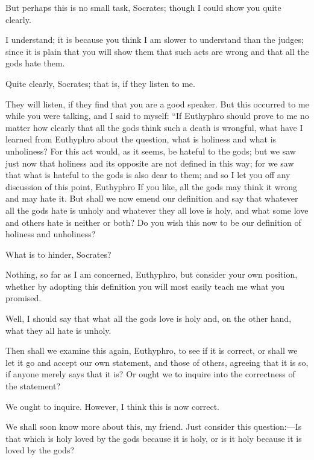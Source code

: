 \documentclass[letterpaper,12pt]{article}
\newcommand{\stephpag}[1]{\marginnote{\small\itshape\fontfamily{ppl}\selectfont #1}}
\begin{document}
\begin{drama}
\euthyphrospeaks
But perhaps this is no small task, Socrates; though I could show you quite clearly.

\socratesspeaks
I understand; it is because you think I am slower to understand than the judges; since it is plain that you will show them that such acts are wrong and that all the gods hate them.

\euthyphrospeaks
Quite clearly, Socrates; that is, if they listen to me.

\socratesspeaks
They will listen, if they find that you are a good speaker. \stephpag{c} But this occurred to me while you were talking, and I said to myself: ``If Euthyphro should prove to me no matter how clearly that all the gods think such a death is wrongful, what have I learned from Euthyphro about the question, what is holiness and what is unholiness? For this act would, as it seems, be hateful to the gods; but we saw just now that holiness and its opposite are not defined in this way; for we saw that what is hateful to the gods is also dear to them; and so I let you off any discussion of this point, Euthyphro If you like, all the gods \stephpag{d} may think it wrong and may hate it. But shall we now emend our definition and say that whatever all the gods hate is unholy and whatever they all love is holy, and what some love and others hate is neither or both? Do you wish this now to be our definition of holiness and unholiness?

\euthyphrospeaks
What is to hinder, Socrates?

\socratesspeaks
Nothing, so far as I am concerned, Euthyphro, but consider your own position, whether by adopting this definition you will most easily teach me what you promised. \stephpag{e}

\euthyphrospeaks
Well, I should say that what all the gods love is holy and, on the other hand, what they all hate is unholy.

\socratesspeaks
Then shall we examine this again, Euthyphro, to see if it is correct, or shall we let it go and accept our own statement, and those of others, agreeing that it is so, if anyone merely says that it is? Or ought we to inquire into the correctness of the statement?

\euthyphrospeaks
We ought to inquire. However, I think this is now correct.

\socratesspeaks
We shall soon know more about this, my friend. \stephpag{10 a} Just consider this question:—Is that which is holy loved by the gods because it is holy, or is it holy because it is loved by the gods?


\end{drama}
\end{document}
